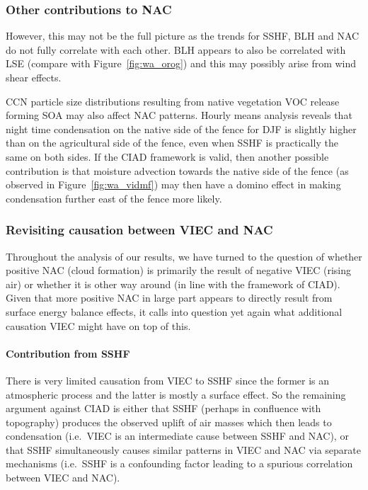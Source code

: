 \subsubsection{Other contributions to NAC}

However, this may not be the full picture as the trends for \ac{SSHF}, \ac{BLH} and \ac{NAC} do not fully correlate with each other. \ac{BLH} appears to also be correlated with \ac{LSE} (compare with Figure~\ref{fig:wa_orog}) and this may possibly arise from wind shear effects.

\ac{CCN} particle size distributions resulting from native vegetation \ac{VOC} release forming \ac{SOA} may also affect \ac{NAC} patterns. Hourly means analysis reveals that night time condensation on the native side of the fence for \ac{DJF} is slightly higher than on the agricultural side of the fence, even when \ac{SSHF} is practically the same on both sides. If the \ac{CIAD} framework is valid, then another possible contribution is that moisture advection towards the native side of the fence (as observed in Figure~\ref{fig:wa_vidmf}) may then have a domino effect in making condensation further east of the fence more likely.

\subsubsection{Revisiting causation between VIEC and NAC}

Throughout the analysis of our results, we have turned to the question of whether positive \ac{NAC} (cloud formation) is primarily the result of negative \ac{VIEC} (rising air) or whether it is other way around (in line with the framework of \ac{CIAD}). Given that more positive \ac{NAC} in large part appears to directly result from surface energy balance effects, it calls into question yet again what additional causation \ac{VIEC} might have on top of this.

\paragraph{Contribution from SSHF}

There is very limited causation from \ac{VIEC} to \ac{SSHF} since the former is an atmospheric process and the latter is mostly a surface effect. So the remaining argument against \ac{CIAD} is either that \ac{SSHF} (perhaps in confluence with topography) produces the observed uplift of air masses which then leads to condensation (i.e.\ \ac{VIEC} is an intermediate cause between \ac{SSHF} and \ac{NAC}), or that \ac{SSHF} simultaneously causes similar patterns in \ac{VIEC} and \ac{NAC} via separate mechanisms (i.e.\ \ac{SSHF} is a confounding factor leading to a spurious correlation between \ac{VIEC} and \ac{NAC}).

